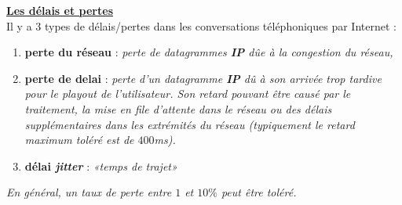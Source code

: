 \documentclass{article}
\newcommand{\bfp}[2]{\item \textbf{#1} : \textit{#2}}
\newcommand{\stitre}[1]{\noindent\textbf{\underline{#1}} \\}
\begin{document}
\stitre{Les délais et pertes}

Il y a 3 types de délais/pertes dans les conversations téléphoniques par Internet : \\
\begin{enumerate}
\bfp{perte du réseau}{perte de datagrammes \textbf{IP} dûe à la congestion du réseau,}
\bfp{perte de delai}{perte d'un datagramme \textbf{IP} dû à son arrivée trop tardive pour le \textit{playout} de
l'utilisateur. Son retard pouvant être causé par le traitement, la mise en file d'attente dans le réseau ou des 
délais supplémentaires dans les extrémités du réseau (typiquement le retard maximum toléré est de $400$ms).}
\bfp{délai \textit{jitter}}{«temps de trajet»}
\end{enumerate}
\textit{En général, un taux de perte entre $1$ et $10\%$ peut être toléré.} \\
\end{document}
